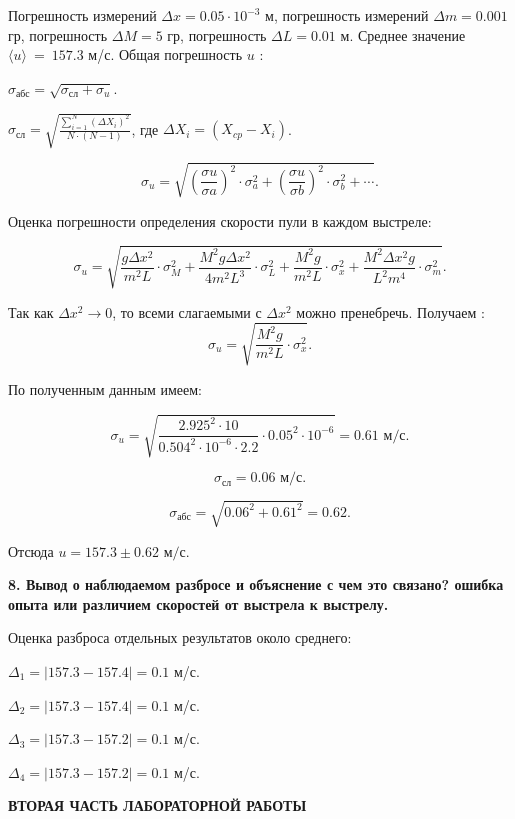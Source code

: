 \documentclass[a4paper,12pt]{article} %
\begin{document}
Погрешность измерений $\Delta x = 0.05\cdot 10^{-3}$ м, погрешность измерений $\Delta m = 0.001$ гр, погрешность $\Delta M = 5$ гр, погрешность $\Delta L = 0.01$ м. Среднее значение $\langle u\rangle\ =\ 157.3$ м/с. Общая погрешность $u$ :

$\sigma_{\textbf{абс}} = \sqrt{\sigma_{\textbf{сл}} + \sigma_{u}}$.

$\sigma_{\textbf{сл}} = \sqrt{\frac{\sum\limits_{i = 1}^{N}(\Delta X_i)^2}{N\cdot (N - 1)}}$, где $\Delta X_i = (X_{cp} - X_i)$. 

\[\sigma_u = \sqrt{(\frac{\sigma u}{\sigma a})^2\cdot \sigma_a^2 + (\frac{\sigma u}{\sigma b})^2\cdot \sigma_b^2 + \cdots}.\]

Оценка погрешности определения скорости пули в каждом выстреле:

\[ \sigma_u = \sqrt{\frac{g\Delta x^2}{m^2L}\cdot \sigma_M^2 + \frac{M^2g\Delta x^2}{4m^2L^3}\cdot \sigma_L^2 + \frac{M^2g}{m^2L}\cdot \sigma_x^2 + \frac{M^2\Delta x^2g}{L^2 m^4}\cdot \sigma_m^2}.\]

Так как $\Delta x^2 \rightarrow 0$, то всеми слагаемыми с $\Delta x^2$ можно пренебречь. Получаем : \[ \sigma_u = \sqrt{\frac{M^2g}{m^2L}\cdot \sigma_x^2} .\]

По полученным данным имеем:

\[ \sigma_u =  \sqrt{\frac{2.925^2 \cdot 10}{0.504^2\cdot 10^{-6} \cdot 2.2}\cdot 0.05^2\cdot 10^{-6}} = 0.61 \textbf{ м/с}.\]

\[ \sigma_{\textbf{сл}} = 0.06\textbf{ м/с}.\] 

\[ \sigma_{\textbf{абс}} = \sqrt{0.06^2 + 0.61^2} = 0.62 .\]

Отсюда $u = 157.3 \pm 0.62 \textbf{ м/с}$.

\begin{center}
{\bf 8. Вывод о наблюдаемом разбросе и объяснение с чем это связано? ошибка опыта или различием скоростей от выстрела к выстрелу.}
\end{center}

Оценка разброса отдельных результатов около среднего:

$\Delta_1 = |157.3 - 157.4| = 0.1$ м/с.

$\Delta_2 = |157.3 - 157.4| = 0.1$ м/с.

$\Delta_3 = |157.3 - 157.2| = 0.1$ м/с.

$\Delta_4 = |157.3 - 157.2| = 0.1$ м/с.


\begin{center}
{\bf ВТОРАЯ ЧАСТЬ ЛАБОРАТОРНОЙ РАБОТЫ}
\end{center}
\end{document}
